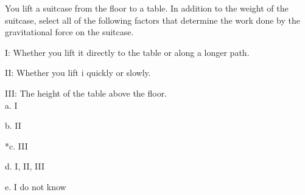 
You lift a suitcase from the floor to a table. In addition to the weight of the suitcase, select all of the following factors that determine the work done by the gravitational force on the suitcase.

I: Whether you lift it directly to the table or along a longer path.

II: Whether you lift i quickly or slowly.

III: The height of the table above the floor. \\

a. I

b. II

*c. III

d. I, II, III

e. I do not know \\
